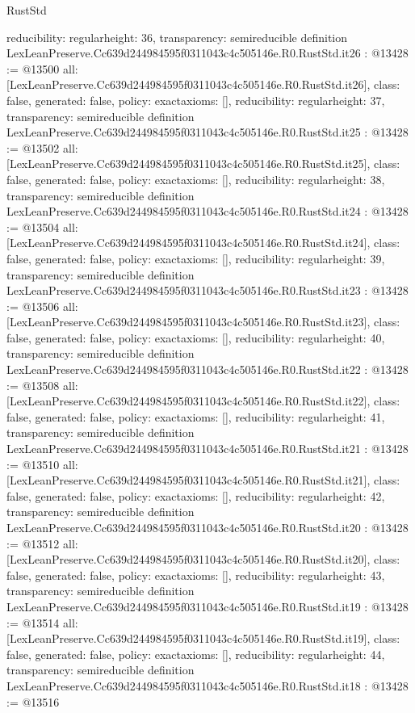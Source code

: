 \begin{lexlean}{RustStd}
\begin{coremodule}
{  reducibility: regular{height: 36},
  transparency: semireducible
}
definition LexLeanPreserve.Cc639d244984595f0311043c4c505146e.R0.RustStd.it26 : @13428 := @13500 {
  all: [LexLeanPreserve.Cc639d244984595f0311043c4c505146e.R0.RustStd.it26],
  class: false,
  generated: false,
  policy: exact{axioms: []},
  reducibility: regular{height: 37},
  transparency: semireducible
}
definition LexLeanPreserve.Cc639d244984595f0311043c4c505146e.R0.RustStd.it25 : @13428 := @13502 {
  all: [LexLeanPreserve.Cc639d244984595f0311043c4c505146e.R0.RustStd.it25],
  class: false,
  generated: false,
  policy: exact{axioms: []},
  reducibility: regular{height: 38},
  transparency: semireducible
}
definition LexLeanPreserve.Cc639d244984595f0311043c4c505146e.R0.RustStd.it24 : @13428 := @13504 {
  all: [LexLeanPreserve.Cc639d244984595f0311043c4c505146e.R0.RustStd.it24],
  class: false,
  generated: false,
  policy: exact{axioms: []},
  reducibility: regular{height: 39},
  transparency: semireducible
}
definition LexLeanPreserve.Cc639d244984595f0311043c4c505146e.R0.RustStd.it23 : @13428 := @13506 {
  all: [LexLeanPreserve.Cc639d244984595f0311043c4c505146e.R0.RustStd.it23],
  class: false,
  generated: false,
  policy: exact{axioms: []},
  reducibility: regular{height: 40},
  transparency: semireducible
}
definition LexLeanPreserve.Cc639d244984595f0311043c4c505146e.R0.RustStd.it22 : @13428 := @13508 {
  all: [LexLeanPreserve.Cc639d244984595f0311043c4c505146e.R0.RustStd.it22],
  class: false,
  generated: false,
  policy: exact{axioms: []},
  reducibility: regular{height: 41},
  transparency: semireducible
}
definition LexLeanPreserve.Cc639d244984595f0311043c4c505146e.R0.RustStd.it21 : @13428 := @13510 {
  all: [LexLeanPreserve.Cc639d244984595f0311043c4c505146e.R0.RustStd.it21],
  class: false,
  generated: false,
  policy: exact{axioms: []},
  reducibility: regular{height: 42},
  transparency: semireducible
}
definition LexLeanPreserve.Cc639d244984595f0311043c4c505146e.R0.RustStd.it20 : @13428 := @13512 {
  all: [LexLeanPreserve.Cc639d244984595f0311043c4c505146e.R0.RustStd.it20],
  class: false,
  generated: false,
  policy: exact{axioms: []},
  reducibility: regular{height: 43},
  transparency: semireducible
}
definition LexLeanPreserve.Cc639d244984595f0311043c4c505146e.R0.RustStd.it19 : @13428 := @13514 {
  all: [LexLeanPreserve.Cc639d244984595f0311043c4c505146e.R0.RustStd.it19],
  class: false,
  generated: false,
  policy: exact{axioms: []},
  reducibility: regular{height: 44},
  transparency: semireducible
}
definition LexLeanPreserve.Cc639d244984595f0311043c4c505146e.R0.RustStd.it18 : @13428 := @13516 {
}
\end{coremodule}
\end{lexlean}
